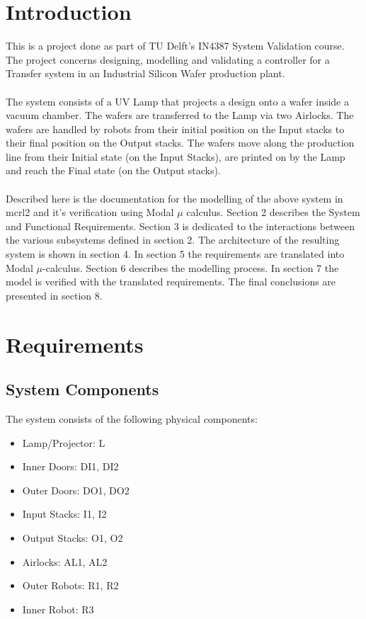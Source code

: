 \documentclass[a4paper,12pt]{article}
\begin{document}
	\section{Introduction}
	This is a project done as part of TU Delft's IN4387 System Validation course. The project concerns designing, modelling and validating a controller for a Transfer system in an Industrial Silicon Wafer production plant.
	\\
	\\The system consists of a UV Lamp that projects a design onto a wafer inside a vacuum chamber. The wafers are transferred to the Lamp via two Airlocks. The wafers are handled by robots from their initial position on the Input stacks to their final position on the Output stacks. The wafers move along the production line from their Initial state (on the Input Stacks), are printed on by the Lamp and reach the Final state (on the Output stacks).
	\\
	\\Described here is the documentation for the modelling of the above system in mcrl2 and it's verification using Modal $\mu$ calculus. Section 2 describes the System and Functional Requirements. Section 3 is dedicated to the interactions between the various subsystems defined in section 2. The architecture of the resulting system is shown in section 4. In section 5 the requirements are translated into Modal $\mu$-calculus. Section 6 describes the modelling process. In section 7 the model is verified with the translated requirements. The final conclusions are presented in section 8.
	
	\section{Requirements}
	
	\subsection{System Components}
	The system consists of the following physical components:
	\begin{itemize}
		\item Lamp/Projector: L
		\item Inner Doors: DI1, DI2
		\item Outer Doors: DO1, DO2
		\item Input Stacks: I1, I2
		\item Output Stacks: O1, O2
		\item Airlocks: AL1, AL2
		\item Outer Robots: R1, R2
		\item Inner Robot: R3
	\end{itemize}
	
\end{document}
